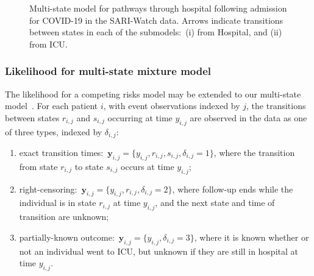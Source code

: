 \begin{figure}[htbp!]
    \centering
    \caption[Multi-state model for pathways through hospital following admission for COVID-19 in the SARI-Watch data]{Multi-state model for pathways through hospital following admission for COVID-19 in the SARI-Watch data. Arrows indicate transitions between states in each of the submodels:\ (i) from Hospital, and (ii) from ICU.}\label{fig:sariwatchdag}
\end{figure}

\subsubsection{Likelihood for multi-state mixture model}

The likelihood for a competing risks model may be extended to our multi-state model~\parencite{Jackson2022-lt}. For each patient $i$, with event observations indexed by $j$, the transitions between states $r_{i,j}$ and $s_{i,j}$ occurring at time $y_{i,j}$ are observed in the data as one of three types, indexed by $\delta_{i,j}$:
%
\begin{enumerate}
    \item exact transition times:\ $\bm{y}_{i,j} = \{y_{i,j},r_{i,j},s_{i,j},\delta_{i,j}=1\}$, where the transition from state $r_{i,j}$ to state $s_{i,j}$ occurs at time $y_{i,j}$;
    \item right-censoring:\ $\bm{y}_{i,j} = \{y_{i,j},r_{i,j},\delta_{i,j}=2\}$, where follow-up ends while the individual is in state $r_{i,j}$ at time $y_{i,j}$, and the next state and time of transition are unknown;
    \item partially-known outcome:\ $\bm{y}_{i,j} = \{y_{i,j},\delta_{i,j}=3\}$, where it is known whether or not an individual went to ICU, but unknown if they are still in hospital at time $y_{i,j}$.
\end{enumerate}

